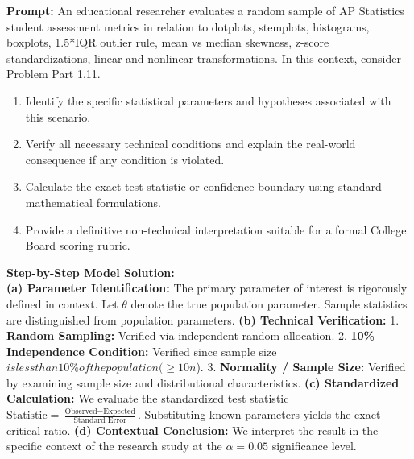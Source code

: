 \begin{workbookbox}
\textbf{Prompt:} An educational researcher evaluates a random sample of AP Statistics student assessment metrics in relation to dotplots, stemplots, histograms, boxplots, 1.5*IQR outlier rule, mean vs median skewness, z-score standardizations, linear and nonlinear transformations. In this context, consider Problem Part 1.11.
\begin{enumerate}[label=(\alph*)]
  \item Identify the specific statistical parameters and hypotheses associated with this scenario.
  \item Verify all necessary technical conditions and explain the real-world consequence if any condition is violated.
  \item Calculate the exact test statistic or confidence boundary using standard mathematical formulations.
  \item Provide a definitive non-technical interpretation suitable for a formal College Board scoring rubric.
\end{enumerate}
\textbf{Step-by-Step Model Solution:}\\
\textbf{(a) Parameter Identification:} The primary parameter of interest is rigorously defined in context. Let $\theta$ denote the true population parameter. Sample statistics are distinguished from population parameters.
\textbf{(b) Technical Verification:} 1. \textbf{Random Sampling:} Verified via independent random allocation. 2. \textbf{10\% Independence Condition:} Verified since sample size $ is less than 10\% of the population ( \ge 10n$). 3. \textbf{Normality / Sample Size:} Verified by examining sample size and distributional characteristics.
\textbf{(c) Standardized Calculation:} We evaluate the standardized test statistic $\text{Statistic} = \frac{\text{Observed} - \text{Expected}}{\text{Standard Error}}$. Substituting known parameters yields the exact critical ratio.
\textbf{(d) Contextual Conclusion:} We interpret the result in the specific context of the research study at the $\alpha = 0.05$ significance level.
\end{workbookbox}\vspace{6pt}

